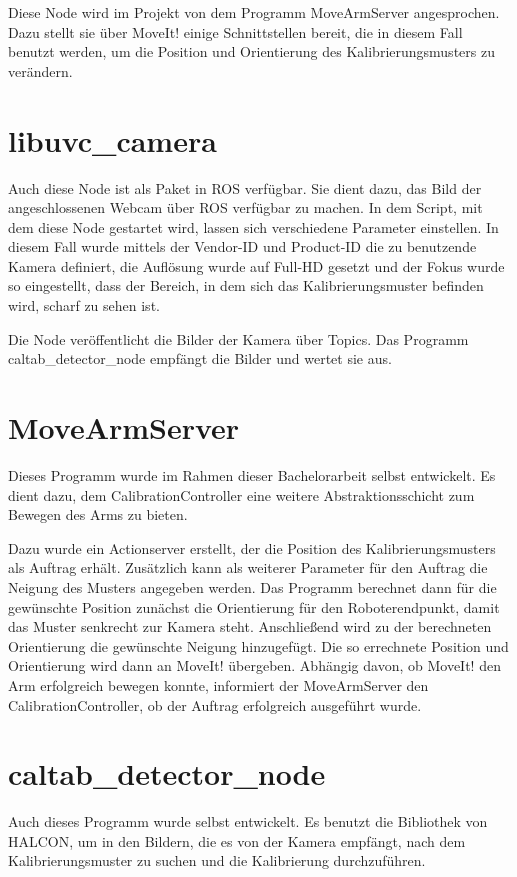 Diese Node wird im Projekt von dem Programm MoveArmServer angesprochen. Dazu stellt sie über MoveIt! einige Schnittstellen bereit, die in diesem Fall benutzt werden, um die Position und Orientierung des Kalibrierungsmusters zu verändern.

\section{libuvc\_camera} %
\label{sec:libuvc_camera}
Auch diese Node ist als Paket in ROS verfügbar. Sie dient dazu, das Bild der angeschlossenen Webcam über ROS verfügbar zu machen. In dem Script, mit dem diese Node gestartet wird, lassen sich verschiedene Parameter einstellen. In diesem Fall wurde mittels der Vendor-ID und Product-ID die zu benutzende Kamera definiert, die Auflösung wurde auf Full-HD gesetzt und der Fokus wurde so eingestellt, dass der Bereich, in dem sich das Kalibrierungsmuster befinden wird, scharf zu sehen ist.

Die Node veröffentlicht die Bilder der Kamera über Topics. Das Programm caltab\_detector\_node empfängt die Bilder und wertet sie aus.

\section{MoveArmServer} %
\label{sec:movearmserver}
Dieses Programm wurde im Rahmen dieser Bachelorarbeit selbst entwickelt. Es dient dazu, dem CalibrationController eine weitere Abstraktionsschicht zum Bewegen des Arms zu bieten.

Dazu wurde ein Actionserver erstellt, der die Position des Kalibrierungsmusters als Auftrag erhält. Zusätzlich kann als weiterer Parameter für den Auftrag die Neigung des Musters angegeben werden. Das Programm berechnet dann für die gewünschte Position zunächst die Orientierung für den Roboterendpunkt, damit das Muster senkrecht zur Kamera steht. Anschließend wird zu der berechneten Orientierung die gewünschte Neigung hinzugefügt. Die so errechnete Position und Orientierung wird dann an MoveIt! übergeben. Abhängig davon, ob MoveIt! den Arm erfolgreich bewegen konnte, informiert der MoveArmServer den CalibrationController, ob der Auftrag erfolgreich ausgeführt wurde.

\section{caltab\_detector\_node} %
\label{sec:caltab_detector_node}
Auch dieses Programm wurde selbst entwickelt. Es benutzt die Bibliothek von HALCON, um in den Bildern, die es von der Kamera empfängt, nach dem Kalibrierungsmuster zu suchen und die Kalibrierung durchzuführen.

